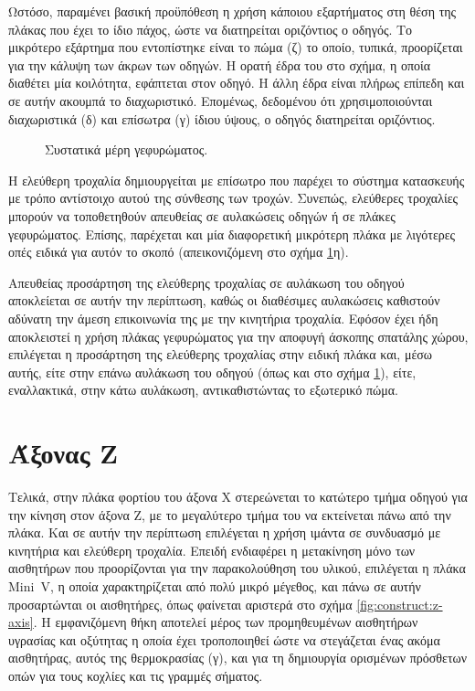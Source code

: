 Ωστόσο, παραμένει βασική προϋπόθεση η χρήση κάποιου εξαρτήματος στη θέση της
πλάκας που έχει το ίδιο πάχος, ώστε να διατηρείται οριζόντιος ο οδηγός. Το
μικρότερο εξάρτημα που εντοπίστηκε είναι το πώμα (ζ) το οποίο, τυπικά,
προορίζεται για την κάλυψη των άκρων των οδηγών. Η ορατή έδρα του στο σχήμα, η
οποία διαθέτει μία κοιλότητα, εφάπτεται στον οδηγό. Η άλλη έδρα είναι πλήρως
επίπεδη και σε αυτήν ακουμπά το διαχωριστικό. Επομένως, δεδομένου ότι
χρησιμοποιούνται διαχωριστικά (δ) και επίσωτρα (γ) ίδιου ύψους, ο οδηγός
διατηρείται οριζόντιος.

\begin{figure}
    \caption{Συστατικά μέρη γεφυρώματος. \label{fig:construct:x-axis-schem}}
    \begin{center}%
    \def\svgwidth{\textwidth}
    
    \end{center}
\end{figure}

Η ελεύθερη τροχαλία δημιουργείται με επίσωτρο που παρέχει το σύστημα κατασκευής
με τρόπο αντίστοιχο αυτού της σύνθεσης των τροχών. Συνεπώς, ελεύθερες τροχαλίες
μπορούν να τοποθετηθούν απευθείας σε αυλακώσεις οδηγών ή σε πλάκες γεφυρώματος.
Επίσης, παρέχεται και μία διαφορετική μικρότερη πλάκα με λιγότερες οπές ειδικά
για αυτόν το σκοπό (απεικονιζόμενη στο σχήμα \ref{fig:construct:x-axis-schem}η).

Απευθείας προσάρτηση της ελεύθερης τροχαλίας σε αυλάκωση του οδηγού αποκλείεται
σε αυτήν την περίπτωση, καθώς οι διαθέσιμες αυλακώσεις καθιστούν αδύνατη την
άμεση επικοινωνία της με την κινητήρια τροχαλία. Εφόσον έχει ήδη αποκλειστεί η
χρήση πλάκας γεφυρώματος για την αποφυγή άσκοπης σπατάλης χώρου, επιλέγεται η
προσάρτηση της ελεύθερης τροχαλίας στην ειδική πλάκα και, μέσω αυτής, είτε στην
επάνω αυλάκωση του οδηγού (όπως και στο σχήμα \ref{fig:construct:x-axis-schem}),
είτε, εναλλακτικά, στην κάτω αυλάκωση, αντικαθιστώντας το εξωτερικό πώμα.

\section{Άξονας Z}

\label{sec:construct:z-axis}
Τελικά, στην πλάκα φορτίου του άξονα X στερεώνεται το κατώτερο τμήμα οδηγού για
την κίνηση στον άξονα Z, με το μεγαλύτερο τμήμα του να εκτείνεται πάνω από την
πλάκα. Και σε αυτήν την περίπτωση επιλέγεται η χρήση ιμάντα σε συνδυασμό με
κινητήρια και ελεύθερη τροχαλία. Επειδή ενδιαφέρει η μετακίνηση μόνο των
αισθητήρων που προορίζονται για την παρακολούθηση του υλικού, επιλέγεται η πλάκα
Mini~V, η οποία χαρακτηρίζεται από πολύ μικρό μέγεθος, και πάνω σε αυτήν
προσαρτώνται οι αισθητήρες, όπως φαίνεται αριστερά στο σχήμα
\ref{fig:construct:z-axis}. Η εμφανιζόμενη θήκη αποτελεί μέρος των προμηθευμένων
αισθητήρων υγρασίας και οξύτητας η οποία έχει τροποποιηθεί ώστε να στεγάζεται
ένας ακόμα αισθητήρας, αυτός της θερμοκρασίας (γ), και για τη δημιουργία
ορισμένων πρόσθετων οπών για τους κοχλίες και τις γραμμές σήματος.

